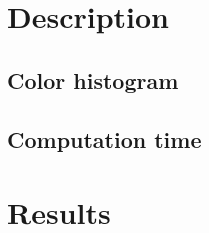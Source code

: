 \documentclass[a4paper,12pt]{article}
\begin{document}
\section{Description}

\subsection{Color histogram}

\subsection{Computation time}

\section{Results}
\end{document}
